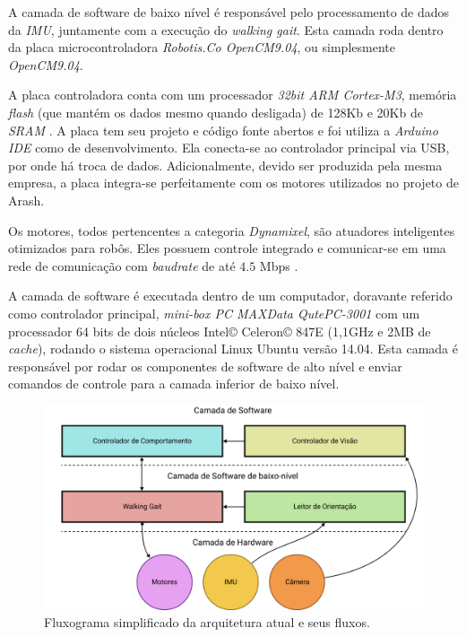 A camada de software de baixo nível é responsável pelo processamento de dados da \textit{IMU}, juntamente com a execução do \textit{walking gait}. Esta camada roda dentro da placa microcontroladora \textit{Robotis.Co OpenCM9.04}, ou simplesmente \textit{OpenCM9.04}.

A placa controladora conta com um processador \textit{32bit ARM Cortex-M3}, memória \textit{flash} (que mantém os dados mesmo quando desligada) de 128Kb e 20Kb de \textit{SRAM} \cite{opencm904}. A placa tem seu projeto e código fonte abertos e foi utiliza a \textit{Arduino IDE} como  de desenvolvimento. Ela conecta-se ao controlador principal via USB, por onde há troca de dados. Adicionalmente, devido ser produzida pela mesma empresa, a placa integra-se perfeitamente com os motores utilizados no projeto de Arash.

Os motores, todos pertencentes a categoria \textit{Dynamixel}, são atuadores inteligentes otimizados para robôs. Eles possuem controle  integrado e comunicar-se em uma rede de comunicação  com \textit{baudrate} de até $4.5$ Mbps \cite{dynamixel}.

A camada de software é executada dentro de um computador, doravante referido como controlador principal, \textit{mini-box PC MAXData QutePC-3001} com um processador 64 bits de dois núcleos Intel\copyright{} Celeron\copyright{} 847E (1,1GHz e 2MB de \textit{cache}), rodando o sistema operacional Linux Ubuntu versão 14.04. Esta camada é responsável por rodar os componentes de software de alto nível e enviar comandos de controle para a camada inferior de baixo nível.

\begin{figure}[htb]
	\centering
	\includegraphics[scale=1]{imagens/svg/softwarearchitecture-flow}
	\caption{Fluxograma simplificado da arquitetura atual e seus fluxos.}
	\label{fig:softwarearchitecture:overview}
\end{figure}

